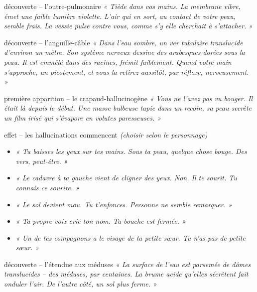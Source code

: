 \documentclass[10pt, a4paper]{article}
\begin{document}
\begin{momentbox}{découverte -- l'outre-pulmonaire}
\textit{« Tiède dans vos mains. La membrane vibre, émet une faible lumière violette. L'air qui en sort, au contact de votre peau, semble frais. La vessie pulse contre vous, comme s'y elle cherchait à s'attacher. »}
\end{momentbox}

\begin{momentbox}{découverte -- l'anguille-câble}
\textit{« Dans l'eau sombre, un ver tubulaire translucide d'environ un mètre. Son système nerveux dessine des arabesques dorées sous la peau. Il est emmêlé dans des racines, frémit faiblement. Quand votre main s'approche, un picotement, et vous la retirez aussitôt, par réflexe, nerveusement. »}
\end{momentbox}

\begin{creaturebox}{première apparition -- le crapaud-hallucinogène}
\textit{« Vous ne l'avez pas vu bouger. Il était là depuis le début. Une masse bulbeuse tapie dans un recoin, sa peau secrète un film irisé qui s'évapore en volutes paresseuses. »}
\end{creaturebox}

\begin{momentbox}{effet -- les hallucinations commencent}
\textit{(choisir selon le personnage)}
\begin{itemize}
    \item \textit{« Tu baisses les yeux sur tes mains. Sous ta peau, quelque chose bouge. Des vers, peut-être. »}
    \item \textit{« Le cadavre à ta gauche vient de cligner des yeux. Non. Il te sourit. Tu connais ce sourire. »}
    \item \textit{« Le sol devient mou. Tu t'enfonces. Personne ne semble remarquer. »}
    \item \textit{« Ta propre voix crie ton nom. Ta bouche est fermée. »}
    \item \textit{« Un de tes compagnons a le visage de ta petite sœur. Tu n'as pas de petite sœur. »}
\end{itemize}
\end{momentbox}

\begin{obstaclebox}{découverte -- l'étendue aux méduses}
\textit{« La surface de l'eau est parsemée de dômes translucides -- des méduses, par centaines. La brume acide qu'elles sécrètent fait onduler l'air. De l'autre côté, un sol plus ferme. »}
\end{obstaclebox}
\end{document}
